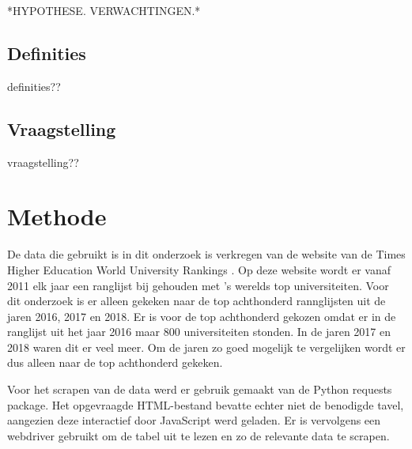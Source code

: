 \documentclass{uva-inf-article}
\begin{document}
*HYPOTHESE. VERWACHTINGEN.*

\subsection{Definities}
definities??

\subsection{Vraagstelling}
vraagstelling??


\section{Methode}

De data die gebruikt is in dit onderzoek is verkregen van de website van de Times Higher Education World University Rankings \cite{Times}. Op deze website wordt er vanaf 2011 elk jaar  een ranglijst bij gehouden met 's werelds top universiteiten. Voor dit onderzoek is er alleen gekeken naar de top achthonderd rannglijsten uit de jaren 2016, 2017 en 2018. Er is voor de top achthonderd gekozen omdat er in de ranglijst uit het jaar 2016 maar 800 universiteiten stonden. In de jaren 2017 en 2018 waren dit er veel meer. Om de jaren zo goed mogelijk te vergelijken wordt er dus alleen naar de top achthonderd gekeken.

Voor het scrapen van de data werd er gebruik gemaakt van de Python requests package. Het opgevraagde HTML-bestand bevatte echter niet de benodigde tavel, aangezien deze interactief door JavaScript werd geladen. Er is vervolgens een webdriver gebruikt om de tabel uit te lezen en zo de relevante data te scrapen. 
\end{document}
